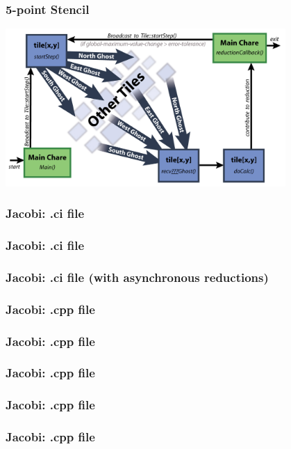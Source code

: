 \documentclass{beamer}
\begin{document}
\begin{frame}[fragile]
  \frametitle{5-point Stencil}
   \begin{center} \includegraphics[width=0.8\textwidth]{diagrams/2DJacobi_LogicFlow.jpg} \end{center}
\end{frame}

\begin{frame}[fragile]
  \frametitle{Jacobi: .ci file}
  
\end{frame}

\begin{frame}[fragile]
  \frametitle{Jacobi: .ci file}
  
\end{frame}

\begin{frame}[fragile]
  \frametitle{Jacobi: .ci file (with \textbf{asynchronous} reductions)}
  
\end{frame}

\begin{frame}[fragile]
  \frametitle{Jacobi: .cpp file}
  
\end{frame}

\begin{frame}[fragile]
  \frametitle{Jacobi: .cpp file}
  
\end{frame}

\begin{frame}[fragile]
  \frametitle{Jacobi: .cpp file}
  
\end{frame}

\begin{frame}[fragile]
  \frametitle{Jacobi: .cpp file}
  
\end{frame}

\begin{frame}[fragile]
  \frametitle{Jacobi: .cpp file}
  
\end{frame}
\end{document}
